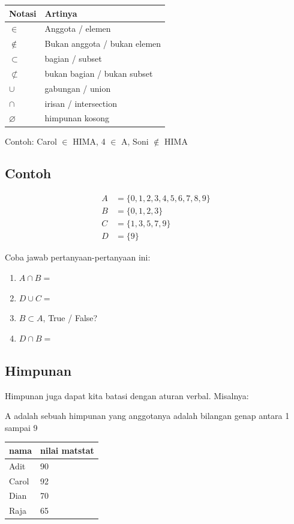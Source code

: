 \documentclass[
  letterpaper,
  DIV=11,
  numbers=noendperiod]{scrartcl}
\begin{document}
\begin{longtable}[]{@{}ll@{}}
\toprule\noalign{}
Notasi & Artinya \\
\midrule\noalign{}
\endhead
\bottomrule\noalign{}
\endlastfoot
\(\in\) & Anggota / elemen \\
\(\not \in\) & Bukan anggota / bukan elemen \\
\(\subset\) & bagian / subset \\
\(\not \subset\) & bukan bagian / bukan subset \\
\(\cup\) & gabungan / union \\
\(\cap\) & irisan / intersection \\
\(\varnothing\) & himpunan kosong \\
\end{longtable}

Contoh: Carol \(\in\) HIMA, 4 \(\in\) A, Soni \(\not \in\) HIMA

\subsection{Contoh}\label{contoh-1}

\[
\begin{align}
A&=\{0,1,2,3,4,5,6,7,8,9\} \\
B&=\{0,1,2,3\} \\
C&=\{1,3,5,7,9\} \\
D&=\{9\}
\end{align}
\]

Coba jawab pertanyaan-pertanyaan ini:

\begin{enumerate}
\def\labelenumi{\arabic{enumi}.}
\item
  \(A \cap B=\)
\item
  \(D \cup C=\)
\item
  \(B \subset A\), True / False?
\item
  \(D \cap B=\)
\end{enumerate}

\subsection{Himpunan}\label{himpunan-1}

Himpunan juga dapat kita batasi dengan aturan verbal. Misalnya:

A adalah sebuah himpunan yang anggotanya adalah bilangan genap antara 1
sampai 9

\begin{longtable}[]{@{}ll@{}}
\toprule\noalign{}
nama & nilai matstat \\
\midrule\noalign{}
\endhead
\bottomrule\noalign{}
\endlastfoot
Adit & 90 \\
Carol & 92 \\
Dian & 70 \\
Raja & 65 \\
\end{longtable}
\end{document}
